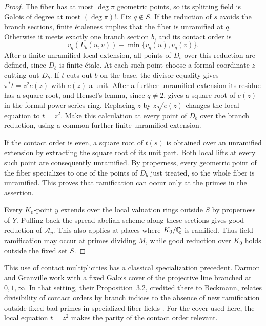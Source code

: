 \begin{proof}
The fiber has at most $\deg\pi$ geometric points, so its splitting
field is Galois of degree at most $(\deg\pi)!$.  Fix $q\notin S$.
If the reduction of $s$ avoids the branch sections, finite étaleness
implies that the fiber is unramified at $q$.  Otherwise it meets
exactly one branch section $b$, and its contact order is
\[
             v_q(L_b(u,v))-\min\{v_q(u),v_q(v)\}.
\]
After a finite unramified local extension, all points of $D_b$ over
this reduction are defined, since $D_b$ is finite étale.  At each
such point choose a formal coordinate $z$ cutting out $D_b$.
If $t$ cuts out $b$ on the base, the divisor equality gives
$\pi^*t=z^2e(z)$ with $e(z)$ a unit.  After a further unramified
extension its residue has a square root, and Hensel's lemma, since
$q\ne2$, gives a square root of $e(z)$ in the formal power-series
ring.  Replacing $z$ by $z\sqrt{e(z)}$ changes the local equation to
$t=z^2$.  Make this calculation at every point of $D_b$ over the
branch reduction, using a common further finite unramified extension.

If the contact order is even, a square root of $t(s)$ is obtained
over an unramified extension by extracting the square root of its
unit part.  Both local lifts at every such point are consequently
unramified.  By properness, every geometric point of the fiber specializes
to one of the points of $D_b$ just treated, so the whole fiber is
unramified.  This proves
that ramification can occur only at the primes in the assertion.

Every $K_0$-point $y$ extends over the local valuation rings outside
$S$ by properness of $Y$.  Pulling back the spread abelian scheme
along these sections gives good reduction of $\mathcal A_y$.
This also applies at places where $K_0/\mathbb Q$ is ramified.  Thus field
ramification may occur at primes dividing $M$, while good reduction
over $K_0$ holds outside the fixed set $S$.
\end{proof}

This use of contact multiplicities has a classical specialization
precedent.  Darmon and Granville work with a fixed Galois cover of
the projective line branched at \(0,1,\infty\).  In that setting,
their Proposition~3.2, credited there to Beckmann, relates
divisibility of contact orders by branch indices to the absence of
new ramification outside fixed bad primes in specialized fiber fields
\cite{DarmonGranville1995}.  For the cover used here, the local
equation \(t=z^2\) makes the parity of the contact order relevant.

